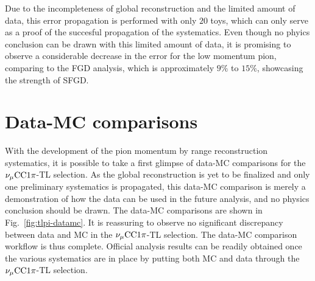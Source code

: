           Due to the incompleteness of global reconstruction and the limited amount of data, this error propagation is performed with only $20$ toys, which can only serve as a proof of the succesful propagation of the systematics.
          Even though no phyics conclusion can be drawn with this limited amount of data, it is promising to observe a considerable decrease in the error for the low momentum pion, comparing to the FGD analysis, which is approximately $9\%$ to $15\%$, showcasing the strength of SFGD.

     \section{Data-MC comparisons}
          With the development of the pion momentum by range reconstruction systematics, it is possible to take a first glimpse of data-MC comparisons for the $\nu_{\mu}\textrm{CC}1\pi$-TL selection. 
          As the global reconstruction is yet to be finalized and only one preliminary systematics is propagated, this data-MC comparison is merely a demonstration of how the data can be used in the future analysis, and no physics conclusion should be drawn.
          The data-MC comparisons are shown in Fig.~\ref{fig:tlpi-datamc}.
          It is reassuring to observe no significant discrepancy between data and MC in the $\nu_{\mu}\textrm{CC}1\pi$-TL selection.
          The data-MC comparison workflow is thus complete.
          Official analysis results can be readily obtained once the various systematics are in place by putting both MC and data through the $\nu_{\mu}\textrm{CC}1\pi$-TL selection.
